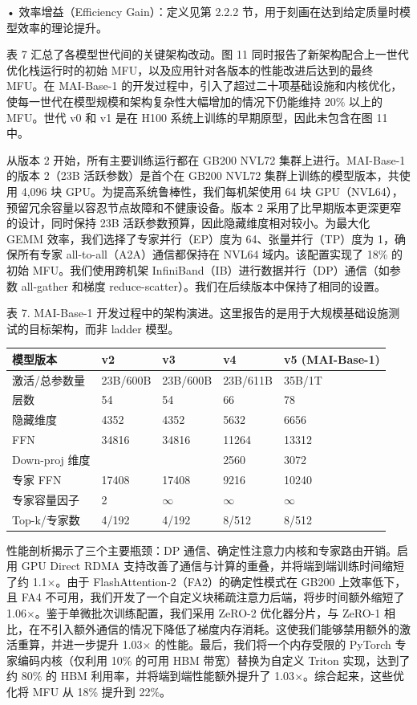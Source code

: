 \documentclass[
  10
]{article}
\newcounter{none} %
\begin{document}
• 效率增益（Efficiency Gain）：定义见第 2.2.2 节，用于刻画在达到给定质量时模型效率的理论提升。

表 7 汇总了各模型世代间的关键架构改动。图 11 同时报告了新架构配合上一世代优化栈运行时的初始 MFU，以及应用针对各版本的性能改进后达到的最终 MFU。在 MAI-Base-1 的开发过程中，引入了超过二十项基础设施和内核优化，使每一世代在模型规模和架构复杂性大幅增加的情况下仍能维持 20\% 以上的 MFU。世代 v0 和 v1 是在 H100 系统上训练的早期原型，因此未包含在图 11 中。

从版本 2 开始，所有主要训练运行都在 GB200 NVL72 集群上进行。MAI-Base-1 的版本 2（23B 活跃参数）是首个在 GB200 NVL72 集群上训练的模型版本，共使用 4,096 块 GPU。为提高系统鲁棒性，我们每机架使用 64 块 GPU（NVL64），预留冗余容量以容忍节点故障和不健康设备。版本 2 采用了比早期版本更深更窄的设计，同时保持 23B 活跃参数预算，因此隐藏维度相对较小。为最大化 GEMM 效率，我们选择了专家并行（EP）度为 64、张量并行（TP）度为 1，确保所有专家 all-to-all（A2A）通信都保持在 NVL64 域内。该配置实现了 18\% 的初始 MFU。我们使用跨机架 InfiniBand（IB）进行数据并行（DP）通信（如参数 all-gather 和梯度 reduce-scatter）。我们在后续版本中保持了相同的设置。



表 7. MAI-Base-1 开发过程中的架构演进。这里报告的是用于大规模基础设施测试的目标架构，而非 ladder 模型。

{\def\LTcaptype{none} %
\begin{longtable}[]{@{}|l|l|l|l|l|@{}}
\toprule\noalign{}
\endhead
\bottomrule\noalign{}
\endlastfoot
\hline
模型版本 & v2 & v3 & v4 & v5 (MAI-Base-1) \\
\hline
激活/总参数量 & 23B/600B & 23B/600B & 23B/611B & 35B/1T \\
\hline
层数 & 54 & 54 & 66 & 78 \\
\hline
隐藏维度 & 4352 & 4352 & 5632 & 6656 \\
\hline
FFN & 34816 & 34816 & 11264 & 13312 \\
\hline
Down-proj 维度 & & & 2560 & 3072 \\
\hline
专家 FFN & 17408 & 17408 & 9216 & 10240 \\
\hline
专家容量因子 & 2 & $\infty$ & $\infty$ & $\infty$ \\
\hline
Top-k/专家数 & 4/192 & 4/192 & 8/512 & 8/512 \\
\hline
\end{longtable}
}

性能剖析揭示了三个主要瓶颈：DP 通信、确定性注意力内核和专家路由开销。启用 GPU Direct RDMA 支持改善了通信与计算的重叠，并将端到端训练时间缩短了约 1.1$\times$。由于 FlashAttention-2（FA2）的确定性模式在 GB200 上效率低下，且 FA4 不可用，我们开发了一个自定义块稀疏注意力后端，将步时间额外缩短了 1.06$\times$。鉴于单微批次训练配置，我们采用 ZeRO-2 优化器分片，与 ZeRO-1 相比，在不引入额外通信的情况下降低了梯度内存消耗。这使我们能够禁用额外的激活重算，并进一步提升 1.03$\times$ 的性能。最后，我们将一个内存受限的 PyTorch 专家编码内核（仅利用 10\% 的可用 HBM 带宽）替换为自定义 Triton 实现，达到了约 80\% 的 HBM 利用率，并将端到端性能额外提升了 1.03$\times$。综合起来，这些优化将 MFU 从 18\% 提升到 22\%。
\end{document}
